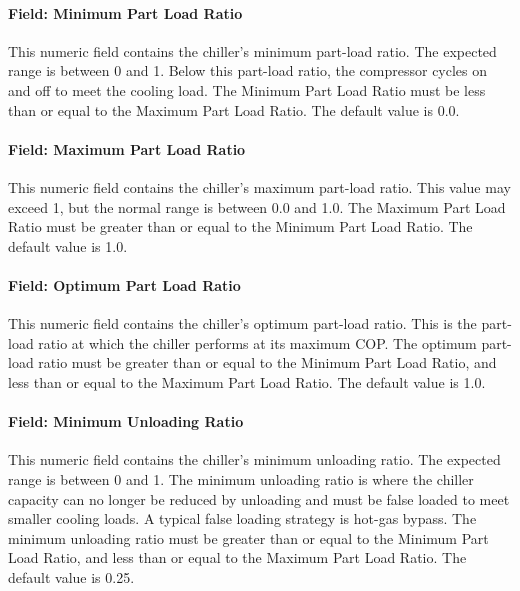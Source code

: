 \paragraph{Field: Minimum Part Load Ratio}\label{field-minimum-part-load-ratio-000}

This numeric field contains the chiller's minimum part-load ratio. The expected range is between 0 and 1. Below this part-load ratio, the compressor cycles on and off to meet the cooling load. The Minimum Part Load Ratio must be less than or equal to the Maximum Part Load Ratio. The default value is 0.0.

\paragraph{Field: Maximum Part Load Ratio}\label{field-maximum-part-load-ratio-000}

This numeric field contains the chiller's maximum part-load ratio. This value may exceed 1, but the normal range is between 0.0 and 1.0. The Maximum Part Load Ratio must be greater than or equal to the Minimum Part Load Ratio. The default value is 1.0.

\paragraph{Field: Optimum Part Load Ratio}\label{field-optimum-part-load-ratio-000}

This numeric field contains the chiller's optimum part-load ratio. This is the part-load ratio at which the chiller performs at its maximum COP. The optimum part-load ratio must be greater than or equal to the Minimum Part Load Ratio, and less than or equal to the Maximum Part Load Ratio. The default value is 1.0.

\paragraph{Field: Minimum Unloading Ratio}\label{field-minimum-unloading-ratio}

This numeric field contains the chiller's minimum unloading ratio. The expected range is between 0 and 1. The minimum unloading ratio is where the chiller capacity can no longer be reduced by unloading and must be false loaded to meet smaller cooling loads. A typical false loading strategy is hot-gas bypass. The minimum unloading ratio must be greater than or equal to the Minimum Part Load Ratio, and less than or equal to the Maximum Part Load Ratio. The default value is 0.25.

